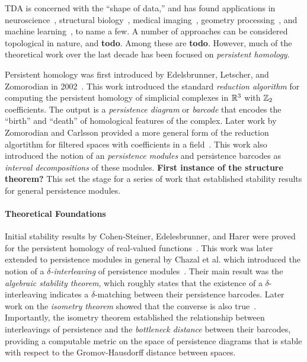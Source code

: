 
TDA is concerned with the ``shape of data,'' and has found applications in
neuroscience~\cite{saggar2018towards, sizemore2019importance},
structural biology~\cite{gameiro2015topological,kovacev2016using,dey2018protein},
medical imaging~\cite{carlsson2008local,robins2011theory,bendich2016persistent},
geometry processing~\cite{skraba2010persistence,poulenard2018topological,bruel2020topology},
and machine learning~\cite{clough2019explicit,chen2019topological,carlsson2020topological,gabrielsson2020topology}, to name a few.
A number of approaches can be considered topological in nature, and \textbf{todo}.
Among these are \textbf{todo}.
However, much of the theoretical work over the last decade has been focused on \emph{persistent homology}.

Persistent homology was first introduced by Edelsbrunner, Letscher, and Zomorodian in 2002~\cite{edelsbrunner02simplification}.
This work introduced the standard \emph{reduction algorithm} for computing the persistent homology of simplicial complexes in $\mathbb{R}^3$ with $\mathbb{Z}_2$ coefficients.
The output is a \emph{persistence diagram} or \emph{barcode} that encodes the ``birth'' and ``death'' of homological features of the complex.
Later work by Zomorodian and Carlsson provided a more general form of the reduction algortithm for filtered spaces with coefficients in a field~\cite{zomorodian05computing}.
This work also introduced the notion of an \emph{persistence modules} and persistence barcodes as \emph{interval decompositions} of these modules.
\textbf{First instance of the structure theorem?}
This set the stage for a series of work that established stability results for general persistence modules.

\paragraph{Theoretical Foundations}

Initial stability results by Cohen-Steiner, Edelesbrunner, and Harer were proved for the persistent homology of real-valued functions~\cite{cohensteiner07stability}.
This work was later extended to persistence modules in general by Chazal et al. which introduced the notion of a \emph{$\delta$-interleaving} of persistence modules~\cite{chazal09proximity}.
Their main result was the \emph{algebraic stability theorem}, which roughly states that the existence of a $\delta$-interleaving indicates a $\delta$-matching between their persistence barcodes.
Later work on the \emph{isometry theorem} showed that the converse is also true~\cite{todo}.
Importantly, the isometry theorem established the relationship between interleavings of persistence and the \emph{bottleneck distance} between their barcodes, providing a computable metric on the space of persistence diagrams that is stable with respect to the Gromov-Hausdorff distance between spaces.

